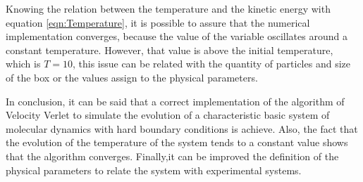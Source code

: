 \documentclass[main.tex]{subfiles}
\begin{document}
Knowing the relation between the temperature and the kinetic energy with equation \eqref{eqn:Temperature}, it is possible to assure that the numerical implementation converges, because the value of the variable oscillates around a constant temperature.
However, that value is above the initial temperature, which is $T=10$, this issue can be related with the quantity of particles and size of the box or the values assign to the physical parameters.

In conclusion, it can be said that a correct implementation of the algorithm of Velocity Verlet to simulate the evolution of a characteristic basic system of molecular dynamics with hard boundary conditions is achieve.
Also, the fact that the evolution of the temperature of the system tends to a constant value shows that the algorithm converges.
Finally,it can be improved the definition of the physical parameters to relate the system with experimental systems.
\end{document}

